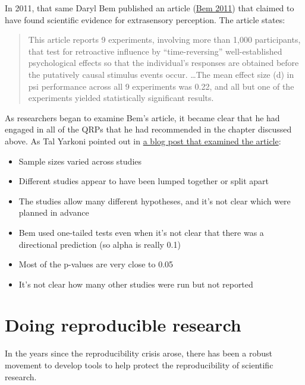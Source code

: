 \documentclass[
  12pt,
]{book}
\providecommand{\tightlist}{%
  \setlength{\itemsep}{0pt}\setlength{\parskip}{0pt}}
\begin{document}
In 2011, that same Daryl Bem published an article (\protect\hyperlink{ref-bem:2011}{Bem 2011}) that claimed to have found scientific evidence for extrasensory perception. The article states:

\begin{quote}
This article reports 9 experiments, involving more than 1,000 participants, that test for retroactive influence by ``time-reversing'' well-established psychological effects so that the individual's responses are obtained before the putatively causal stimulus events occur. \ldots The mean effect size (d) in psi performance across all 9 experiments was 0.22, and all but one of the experiments yielded statistically significant results.
\end{quote}

As researchers began to examine Bem's article, it became clear that he had engaged in all of the QRPs that he had recommended in the chapter discussed above. As Tal Yarkoni pointed out in \href{http://www.talyarkoni.org/blog/2011/01/10/the-psychology-of-parapsychology-or-why-good-researchers-publishing-good-articles-in-good-journals-can-still-get-it-totally-wrong/}{a blog post that examined the article}:

\begin{itemize}
\tightlist
\item
  Sample sizes varied across studies
\item
  Different studies appear to have been lumped together or split apart
\item
  The studies allow many different hypotheses, and it's not clear which were planned in advance
\item
  Bem used one-tailed tests even when it's not clear that there was a directional prediction (so alpha is really 0.1)
\item
  Most of the p-values are very close to 0.05
\item
  It's not clear how many other studies were run but not reported
\end{itemize}

\hypertarget{doing-reproducible-research-1}{%
\section{Doing reproducible research}\label{doing-reproducible-research-1}}

In the years since the reproducibility crisis arose, there has been a robust movement to develop tools to help protect the reproducibility of scientific research.
\end{document}
